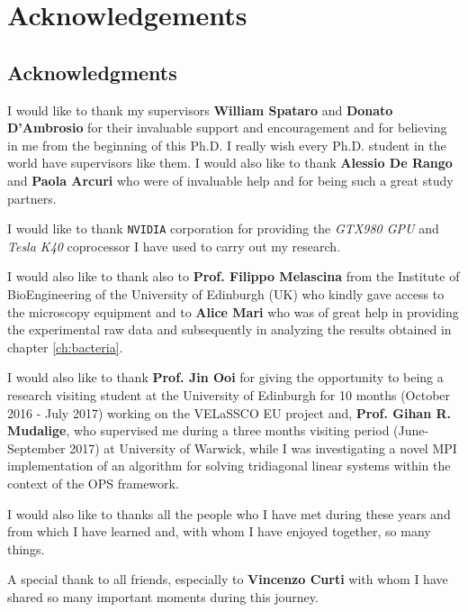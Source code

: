 
\bigskip

\begingroup
\let\clearpage\relax
\let\cleardoublepage\relax
\let\cleardoublepage\relax
\chapter*{Acknowledgements}

\def\thanks#1{%
\begingroup
\leftskip1em
\noindent #1
\par
\endgroup
}

\section*{Acknowledgments}
I would like to thank my supervisors \textbf{William Spataro} and \textbf{Donato D'Ambrosio} for their invaluable support and encouragement and for believing in me from the beginning of this  Ph.D. I really wish every Ph.D. student in the world have supervisors like them. 
I would also like to thank \textbf{Alessio De Rango} and \textbf{Paola Arcuri} who were of invaluable help and for being such a great study partners.

I would like to thank \texttt{NVIDIA} corporation for providing the \textit{GTX980 GPU}
and \textit{Tesla K40} coprocessor I have used to carry out my research.

I would also like to thank also to \textbf{Prof. Filippo Melascina} from the Institute of BioEngineering of the University of Edinburgh (UK) who kindly gave access to the microscopy equipment and to \textbf{Alice Mari} who was of great help in providing the experimental raw data and subsequently in analyzing the results obtained in chapter \ref{ch:bacteria}.

I would also like to thank \textbf{Prof. Jin Ooi} for giving the opportunity to being a research visiting student at the University of Edinburgh for 10 months (October 2016 - July 2017) working on the VELaSSCO EU project and, \textbf{Prof. Gihan R. Mudalige}, who supervised me during a three months visiting period (June- September 2017) at University of Warwick, while I was investigating a novel MPI implementation of an algorithm for solving tridiagonal linear systems within the context of the OPS framework.

I would also like to thanks all the people who I have met during these years and from which I have learned and, with whom I have enjoyed together, so many things.

A special thank to all friends, especially to \textbf{Vincenzo Curti}  with whom I have shared so many important moments during this journey.

\endgroup
